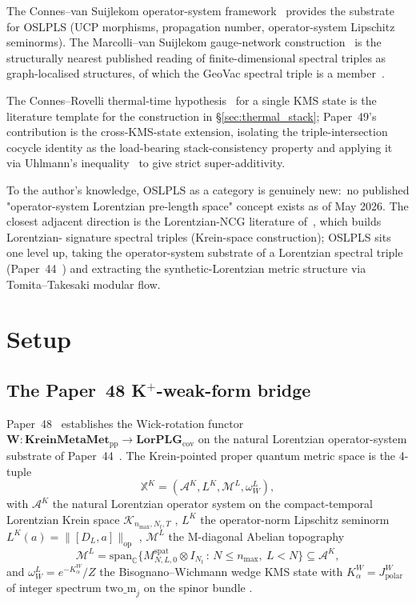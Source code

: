 \documentclass[11pt,a4paper]{article}
\theoremstyle{plain}
\theoremstyle{definition}
\newcommand{\nmax}{n_{\max}}
\newcommand{\Nt}{N_{t}}
\newcommand{\Krein}{\mathcal{K}}
\newcommand{\Acal}{\mathcal{A}}
\newcommand{\Mcal}{\mathcal{M}}
\newcommand{\opnorm}[1]{\lVert #1 \rVert_{\mathrm{op}}}
\newcommand{\C}{\mathbb{C}}
\newcommand{\DL}{D_{L}}
\newcommand{\Wfun}{\mathbf{W}}
\newcommand{\KreinMM}{\mathbf{KreinMetaMet}_{\mathrm{pp}}}
\newcommand{\LorPLG}{\mathbf{LorPLG}_{\mathrm{cov}}}
\newcommand{\BWvac}{\omega_{W}^{L}}
\newcommand{\Kalpha}{K_{\alpha}^{W}}
\newcommand{\Mspat}[3]{M^{\mathrm{spat}}_{#1,#2,#3}}
\begin{document}
The Connes--van Suijlekom operator-system framework~\cite{connes_vs2021}
provides the substrate for OSLPLS (UCP morphisms, propagation number,
operator-system Lipschitz seminorms). The Marcolli--van Suijlekom
gauge-network construction~\cite{marcolli_vs2014} is the structurally
nearest published reading of finite-dimensional spectral triples as
graph-localised structures, of which the GeoVac spectral triple is
a member~\cite{paper32}.

The Connes--Rovelli thermal-time
hypothesis~\cite{connes_rovelli1994} for a single KMS state is the
literature template for the construction in
\S\ref{sec:thermal_stack}; Paper~49's contribution is the
cross-KMS-state extension, isolating the triple-intersection cocycle
identity as the load-bearing stack-consistency property and applying
it via Uhlmann's inequality~\cite{uhlmann1977,lindblad1975,wilde2017}
to give strict super-additivity.

To the author's knowledge, OSLPLS as a category is genuinely new:\ no
published "operator-system Lorentzian pre-length space" concept
exists as of May 2026. The closest adjacent direction is the
Lorentzian-NCG literature
of~\cite{bizi_brouder_besnard2018,vandungen2016,strohmaier2006,
franco_eckstein2014,nieuviarts2025_v2}, which builds Lorentzian-
signature spectral triples (Krein-space construction); OSLPLS sits
one level up, taking the operator-system substrate of a Lorentzian
spectral triple (Paper~44~\cite{paper44}) and extracting the
synthetic-Lorentzian metric structure via Tomita--Takesaki modular
flow.

\section{Setup}\label{sec:setup}

\subsection{The Paper~48 K$^{+}$-weak-form bridge}
\label{sec:paper48_recap}

Paper~48~\cite{paper48} establishes the Wick-rotation functor
$\Wfun:\KreinMM\to\LorPLG$ on the natural Lorentzian operator-system
substrate of Paper~44~\cite{paper44}. The Krein-pointed proper quantum
metric space is the 4-tuple
\[
  \mathbb{X}^{K} = (\Acal^{K},L^{K},\Mcal^{L},\BWvac),
\]
with $\Acal^{K}$ the natural Lorentzian operator system on the
compact-temporal Lorentzian Krein space $\Krein_{\nmax,\Nt,T}$
\cite{paper44}, $L^{K}$ the operator-norm Lipschitz seminorm
$L^{K}(a)=\opnorm{[\DL,a]}$ \cite{paper46}, $\Mcal^{L}$ the M-diagonal
Abelian topography
\[
  \Mcal^{L} = \mathrm{span}_{\C}\!\big\{\Mspat{N}{L}{0}\otimes I_{\Nt}\,:\,N\le\nmax,\ L<N\big\}\subseteq\Acal^{K},
\]
and $\BWvac=e^{-\Kalpha}/Z$ the Bisognano--Wichmann wedge KMS state
with $\Kalpha=J_{\mathrm{polar}}^{W}$ of integer spectrum
$\mathrm{two\_m}_{j}$ on the spinor bundle \cite{paper42}.
\end{document}
